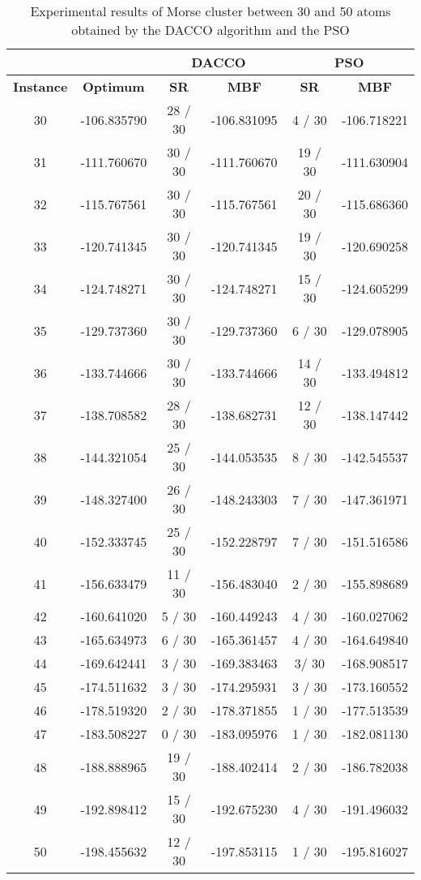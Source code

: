 	\begin{table}[!htdp]
			\begin{center}
				\begin{tabular}{| c | c | c | c | c | c |}
					\hline
					\multicolumn{2}{|c|}{} & \multicolumn{2}{c|}{\textbf{DACCO}} & \multicolumn{2}{c|}{\textbf{PSO}}\\ \hline
					\textbf{Instance} & \textbf{Optimum} & \textbf{SR} & \textbf{MBF} & \textbf{SR} & \textbf{MBF} \\ \hline
					30 & -106.835790 & 28 / 30 & -106.831095 & 4 / 30 & -106.718221 \\ \hline
					31 & -111.760670 & 30 / 30 & -111.760670 & 19 / 30 & -111.630904 \\ \hline
					32 & -115.767561 & 30 / 30 & -115.767561 & 20 / 30 & -115.686360 \\ \hline
					33 & -120.741345 & 30 / 30 & -120.741345 & 19 / 30 & -120.690258 \\ \hline
					34 & -124.748271 & 30 / 30 & -124.748271 & 15 / 30 & -124.605299 \\ \hline
					35 & -129.737360 & 30 / 30 & -129.737360 & 6 / 30 & -129.078905 \\ \hline
					36 & -133.744666 & 30 / 30 & -133.744666 & 14 / 30 & -133.494812 \\ \hline
					37 & -138.708582 & 28 / 30 & -138.682731 & 12 / 30 & -138.147442 \\ \hline
					38 & -144.321054 & 25 / 30 & -144.053535 & 8 / 30 & -142.545537 \\ \hline
					39 & -148.327400 & 26 / 30 & -148.243303 & 7 / 30 & -147.361971 \\ \hline
					40 & -152.333745 & 25 / 30 & -152.228797 & 7 / 30 & -151.516586 \\ \hline
					41 & -156.633479 & 11 / 30 & -156.483040 & 2 / 30 & -155.898689 \\ \hline
					42 & -160.641020 & 5 / 30 & -160.449243 & 4 / 30 & -160.027062 \\ \hline
					43 & -165.634973 & 6 / 30 & -165.361457 & 4 / 30 & -164.649840 \\ \hline
					44 & -169.642441 & 3 / 30 & -169.383463 & 3/ 30 & -168.908517 \\ \hline
					45 & -174.511632 & 3 / 30 & -174.295931 & 3 / 30 & -173.160552 \\ \hline
					46 & -178.519320 & 2 / 30 & -178.371855 & 1 / 30 & -177.513539 \\ \hline
					47 & -183.508227 & 0 / 30 & -183.095976 & 1 / 30 & -182.081130 \\ \hline
					48 & -188.888965 & 19 / 30 & -188.402414 & 2 / 30 & -186.782038 \\ \hline
					49 & -192.898412 & 15 / 30 & -192.675230 & 4 / 30 & -191.496032 \\ \hline
					50 & -198.455632 & 12 / 30 & -197.853115 & 1 / 30 & -195.816027 \\ \hline
				\end{tabular}
			\end{center}
			\caption{Experimental results of Morse cluster between 30 and 50 atoms obtained by the DACCO algorithm and the PSO}
			\label{tab:dacco_vs_pso}
		\end{table}
		
